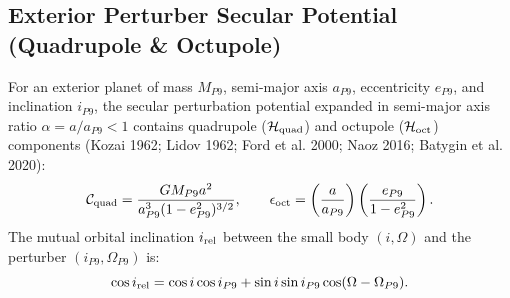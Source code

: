 \documentclass[11pt,a4paper]{article}
\begin{document}
\subsection{Exterior Perturber Secular Potential (Quadrupole \& Octupole)}
For an exterior planet of mass $M_{P9}$, semi-major axis $a_{P9}$, eccentricity $e_{P9}$, and inclination $i_{P9}$, the secular perturbation potential expanded in semi-major axis ratio $\alpha = a / a_{P9} < 1$ contains quadrupole ($\mathcal{H}_{\rm quad}$) and octupole ($\mathcal{H}_{\rm oct}$) components (Kozai 1962; Lidov 1962; Ford et al. 2000; Naoz 2016; Batygin et al. 2020):
\begin{equation}
\mathcal{C}_{\rm quad} = \frac{G M_{P9} a^2}{a_{P9}^3 (1 - e_{P9}^2)^{3/2}}, \qquad \epsilon_{\rm oct} = \left(\frac{a}{a_{P9}}\right) \left(\frac{e_{P9}}{1 - e_{P9}^2}\right).
\end{equation}
The mutual orbital inclination $i_{\rm rel}$ between the small body $(i, \Omega)$ and the perturber $(i_{P9}, \Omega_{P9})$ is:
\begin{equation}
\cos i_{\rm rel} = \cos i \cos i_{P9} + \sin i \sin i_{P9} \cos(\Omega - \Omega_{P9}).
\end{equation}
\end{document}
